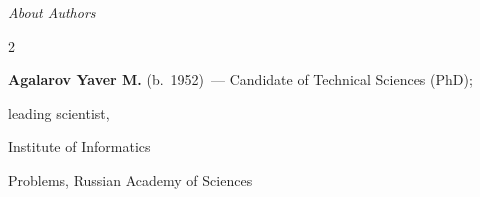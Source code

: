 




\begin{center}\LARGE


\textit{About Authors}


\end{center}


\thispagestyle{empty}





\vspace*{24pt}








\begin{multicols}{2}





\noindent


\textbf{Agalarov Yaver M.} (b.\ 1952)~--- Candidate of Technical Sciences (PhD); 


leading scientist,


Institute of Informatics


Problems, Russian Academy of Sciences






































\end{multicols}

